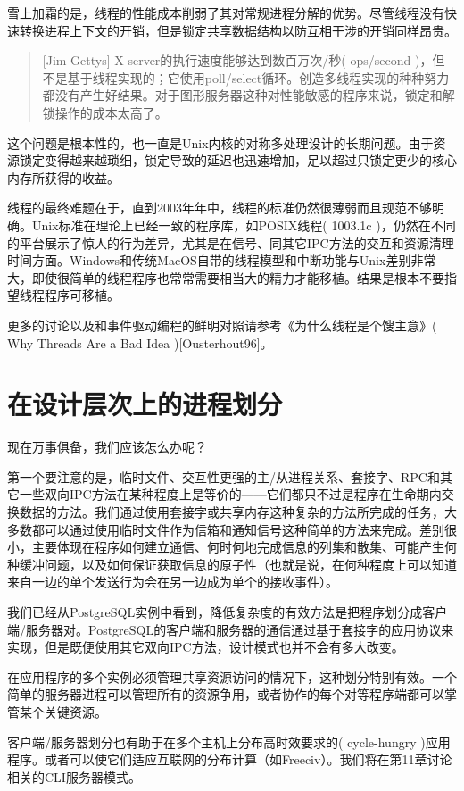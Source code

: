 \documentclass[12pt,oneside]{book}
\begin{document}
\begin{common-format}
雪上加霜的是，线程的性能成本削弱了其对常规进程分解的优势。尽管线程没有快速转换进程上下文的开销，但是锁定共享数据结构以防互相干涉的开销同样昂贵。

\begin{quote}[Jim Gettys]
X server的执行速度能够达到数百万次/秒( ops/second )，但不是基于线程实现的；它使用poll/select循环。创造多线程实现的种种努力都没有产生好结果。对于图形服务器这种对性能敏感的程序来说，锁定和解锁操作的成本太高了。
\end{quote}

这个问题是根本性的，也一直是Unix内核的对称多处理设计的长期问题。由于资源锁定变得越来越琐细，锁定导致的延迟也迅速增加，足以超过只锁定更少的核心内存所获得的收益。

线程的最终难题在于，直到2003年年中，线程的标准仍然很薄弱而且规范不够明确。Unix标准在理论上已经一致的程序库，如POSIX线程( 1003.1c )，仍然在不同的平台展示了惊人的行为差异，尤其是在信号、同其它IPC方法的交互和资源清理时间方面。Windows和传统MacOS自带的线程模型和中断功能与Unix差别非常大，即使很简单的线程程序也常常需要相当大的精力才能移植。结果是根本不要指望线程程序可移植。

更多的讨论以及和事件驱动编程的鲜明对照请参考《为什么线程是个馊主意》( Why Threads Are a Bad Idea )[Ousterhout96]。


\section{在设计层次上的进程划分}
现在万事俱备，我们应该怎么办呢？

第一个要注意的是，临时文件、交互性更强的主/从进程关系、套接字、RPC和其它一些双向IPC方法在某种程度上是等价的——它们都只不过是程序在生命期内交换数据的方法。我们通过使用套接字或共享内存这种复杂的方法所完成的任务，大多数都可以通过使用临时文件作为信箱和通知信号这种简单的方法来完成。差别很小，主要体现在程序如何建立通信、何时何地完成信息的列集和散集、可能产生何种缓冲问题，以及如何保证获取信息的原子性（也就是说，在何种程度上可以知道来自一边的单个发送行为会在另一边成为单个的接收事件）。

我们已经从PostgreSQL实例中看到，降低复杂度的有效方法是把程序划分成客户端/服务器对。PostgreSQL的客户端和服务器的通信通过基于套接字的应用协议来实现，但是既便使用其它双向IPC方法，设计模式也并不会有多大改变。

在应用程序的多个实例必须管理共享资源访问的情况下，这种划分特别有效。一个简单的服务器进程可以管理所有的资源争用，或者协作的每个对等程序端都可以掌管某个关键资源。

客户端/服务器划分也有助于在多个主机上分布高时效要求的(  cycle-hungry )应用程序。或者可以使它们适应互联网的分布计算（如Freeciv）。我们将在第11章讨论相关的CLI服务器模式。


\end{common-format}
\end{document}

